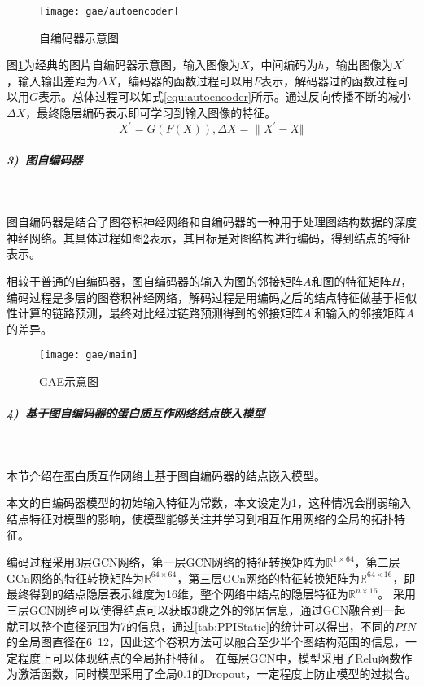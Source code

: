 \begin{figure}[htbp]
    \centering
    \texttt{[image: gae/autoencoder]}
    \caption{自编码器示意图}
    \label{fig:gae/autoencoder}
\end{figure}

图\ref{fig:gae/autoencoder}为经典的图片自编码器示意图，输入图像为$X$，中间编码为$h$，输出图像为$X^\prime $，输入输出差距为$\varDelta X$，编码器的函数过程可以用$F$表示，解码器过的函数过程可以用$G$表示。总体过程可以如式\ref{equ:autoencoder}所示。通过反向传播不断的减小$\varDelta X$，最终隐层编码表示即可学习到输入图像的特征。
\begin{equation}
    \label{equ:autoencoder}
    X^\prime =G(F(X)),
    \varDelta X={\| X^\prime - X \Vert}
\end{equation}

\subparagraph{3)~图自编码器} ~

图自编码器是结合了图卷积神经网络和自编码器的一种用于处理图结构数据的深度神经网络。其具体过程如图\ref{fig:gae/main}表示，其目标是对图结构进行编码，得到结点的特征表示。

相较于普通的自编码器，图自编码器的输入为图的邻接矩阵$A$和图的特征矩阵$H$，编码过程是多层的图卷积神经网络，解码过程是用编码之后的结点特征做基于相似性计算的链路预测，最终对比经过链路预测得到的邻接矩阵$A^{\prime}$和输入的邻接矩阵$A$的差异。

\begin{figure}[htbp]
    \centering
    \texttt{[image: gae/main]}
    \caption{GAE示意图}
    \label{fig:gae/main}
\end{figure}


\subparagraph{4)~基于图自编码器的蛋白质互作网络结点嵌入模型} ~

本节介绍在蛋白质互作网络上基于图自编码器的结点嵌入模型。

本文的自编码器模型的初始输入特征为常数，本文设定为1，这种情况会削弱输入结点特征对模型的影响，使模型能够关注并学习到相互作用网络的全局的拓扑特征。

编码过程采用3层GCN网络，第一层GCN网络的特征转换矩阵为$\mathbb{R} ^{1\times 64}$，第二层GCn网络的特征转换矩阵为$\mathbb{R} ^{64\times 64}$，第三层GCn网络的特征转换矩阵为$\mathbb{R} ^{64\times 16}$，即最终得到的结点隐层表示维度为16维，整个网络中结点的隐层特征为$\mathbb{R} ^{n\times 16}$。
采用三层GCN网络可以使得结点可以获取3跳之外的邻居信息，通过GCN融合到一起就可以整个直径范围为7的信息，通过\ref{tab:PPIStatic}的统计可以得出，不同的$PIN$的全局图直径在6~12，因此这个卷积方法可以融合至少半个图结构范围的信息，一定程度上可以体现结点的全局拓扑特征。
在每层GCN中，模型采用了Relu函数作为激活函数，同时模型采用了全局0.1的Dropout，一定程度上防止模型的过拟合。

